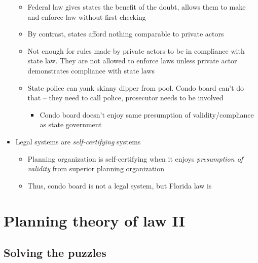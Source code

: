 \begin{itemize}
  \begin{itemize}
  \tightlist
  \item
    Federal law gives states the benefit of the doubt, allows them to
    make and enforce law without first checking
  \item
    By contrast, states afford nothing comparable to private actors
  \item
    Not enough for rules made by private actors to be in compliance with
    state law. They are not allowed to enforce laws unless private actor
    demonstrates compliance with state laws
  \item
    State police can yank skinny dipper from pool. Condo board can't do
    that -- they need to call police, prosecutor needs to be involved

    \begin{itemize}
    \tightlist
    \item
      Condo board doesn't enjoy same presumption of validity/compliance
      as state government
    \end{itemize}
  \end{itemize}
\item
  Legal systems are \emph{self-certifying} systems

  \begin{itemize}
  \tightlist
  \item
    Planning organization is self-certifying when it enjoys
    \emph{presumption of validity} from superior planning organization
  \item
    Thus, condo board is not a legal system, but Florida law is
  \end{itemize}
\end{itemize}

\hypertarget{planning-theory-of-law-ii}{%
\section{Planning theory of law II}\label{planning-theory-of-law-ii}}

\hypertarget{solving-the-puzzles}{%
\subsection{Solving the puzzles}\label{solving-the-puzzles}}

